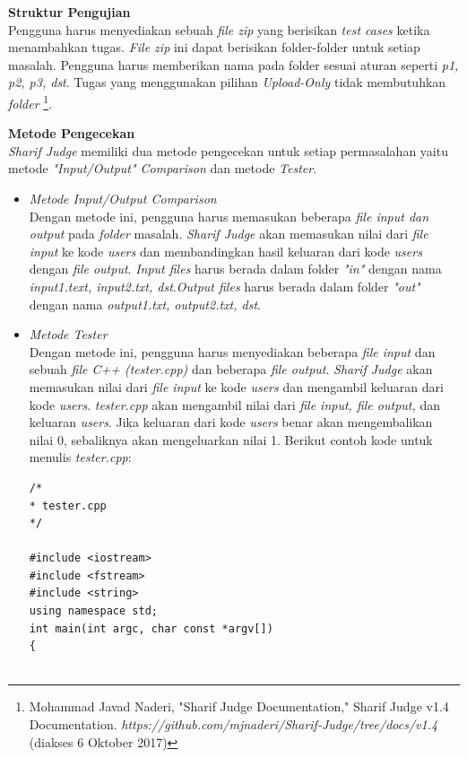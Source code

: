 \documentclass[a4paper,twoside]{article}
\begin{document}
\begin{enumerate}
\begin{enumerate}
			\textbf{Struktur Pengujian} \\			
			Pengguna harus menyediakan sebuah \textit{file zip} yang berisikan \textit{test cases} ketika menambahkan tugas. \textit{File zip} ini dapat berisikan folder-folder untuk setiap masalah. Pengguna harus memberikan nama pada folder sesuai aturan seperti \textit{p1, p2, p3, dst}. Tugas yang menggunakan pilihan \textit{Upload-Only} tidak membutuhkan \textit{folder} \footnote{Mohammad Javad Naderi, "Sharif Judge Documentation," Sharif Judge v1.4 Documentation. \textit{https://github.com/mjnaderi/Sharif-Judge/tree/docs/v1.4} (diakses 6 Oktober 2017)}.
			
			\textbf{Metode Pengecekan} \\
			\textit{Sharif Judge} memiliki dua metode pengecekan untuk setiap permasalahan yaitu metode \textit{"Input/Output" Comparison} dan metode \textit{Tester}.
			\begin{itemize}
				\item \textit{Metode Input/Output Comparison} \\
				Dengan metode ini, pengguna harus memasukan beberapa \textit{file input dan output} pada \textit{folder} masalah. \textit{Sharif Judge} akan memasukan nilai dari \textit{file input} ke kode \textit{users} dan membandingkan hasil keluaran dari kode \textit{users} dengan \textit{file output}. \textit{Input files} harus berada dalam folder \textit{"in"} dengan nama \textit{input1.text, input2.txt, dst}.\textit{Output files} harus berada dalam folder \textit{"out"} dengan nama \textit{output1.txt, output2.txt, dst}.
				
				\item \textit{Metode Tester} \\
				Dengan metode ini, pengguna harus menyediakan beberapa \textit{file input} dan sebuah \textit{file C++ (tester.cpp)} dan beberapa \textit{file output}. \textit{Sharif Judge} akan memasukan nilai dari \textit{file input} ke kode \textit{users} dan mengambil keluaran dari kode \textit{users}. \textit{tester.cpp} akan mengambil nilai dari \textit{file input, file output, }dan keluaran \textit{users}. Jika keluaran dari kode \textit{users} benar akan mengembalikan nilai 0, sebaliknya akan mengeluarkan nilai 1. Berikut contoh kode untuk menulis \textit{tester.cpp}:
				\begin{lstlisting}[backgroundcolor = \color{lightgray}]
/*
* tester.cpp
*/

#include <iostream>
#include <fstream>
#include <string>
using namespace std;
int main(int argc, char const *argv[])
{


\end{lstlisting}
\end{itemize}
\end{enumerate}
\end{enumerate}
\end{document}
